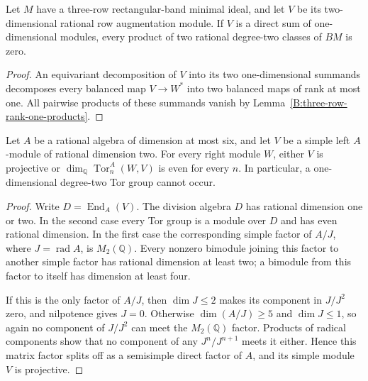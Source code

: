 \begin{corollary}\label{B:three-row-semisimple-cups}
Let $M$ have a three-row rectangular-band minimal ideal, and let
$V$ be its two-dimensional rational row augmentation module.
If $V$ is a direct sum of one-dimensional modules, every product
of two rational degree-two classes of $BM$ is zero.
\end{corollary}
\begin{proof}
An equivariant decomposition of $V$ into its two one-dimensional
summands decomposes every balanced map $V\to W^*$ into two
balanced maps of rank at most one.  All pairwise products of
these summands vanish by Lemma~\ref{B:three-row-rank-one-products}.
\end{proof}

\begin{lemma}\label{B:six-dimensional-simple-row}
Let $A$ be a rational algebra of dimension at most six, and let
$V$ be a simple left $A$-module of rational dimension two.
For every right module $W$, either $V$ is projective or
$\dim_{\mathbb Q}\operatorname{Tor}^A_n(W,V)$ is even for every
$n$.  In particular, a one-dimensional degree-two Tor group
cannot occur.
\end{lemma}
\begin{proof}
Write $D=\operatorname{End}_A(V)$.  The division algebra $D$ has
rational dimension one or two.  In the second case every Tor
group is a module over $D$ and has even rational dimension.
In the first case the corresponding simple factor of
$A/J$, where $J=\operatorname{rad}A$, is $M_2(\mathbb Q)$.
Every nonzero bimodule joining this factor to another simple
factor has rational dimension at least two; a bimodule from
this factor to itself has dimension at least four.

If this is the only factor of $A/J$, then $\dim J\leq2$ makes
its component in $J/J^2$ zero, and nilpotence gives $J=0$.
Otherwise $\dim(A/J)\geq5$ and $\dim J\leq1$, so again no
component of $J/J^2$ can meet the $M_2(\mathbb Q)$ factor.
Products of radical components show that no component of any
$J^n/J^{n+1}$ meets it either.  Hence this matrix factor splits
off as a semisimple direct factor of $A$, and its simple module
$V$ is projective.
\end{proof}

